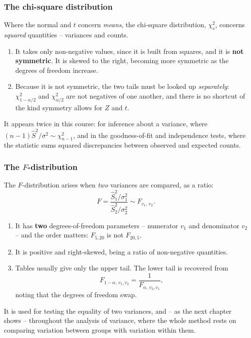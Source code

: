 \documentclass[11pt,a4paper]{article}
\theoremstyle{definition}
\begin{document}
\subsubsection{The chi-square distribution}

Where the normal and $t$ concern \emph{means}, the chi-square distribution, $\chi^2_{v}$,
concerns \emph{squared} quantities -- variances and counts.
\begin{enumerate}
\item It takes only non-negative values, since it is built from squares, and it is
\textbf{not symmetric}. It is skewed to the right, becoming more symmetric as the degrees
of freedom increase.
\item Because it is not symmetric, the two tails must be looked up \emph{separately}:
$\chi^2_{1-\alpha/2}$ and $\chi^2_{\alpha/2}$ are not negatives of one another, and there
is no shortcut of the kind symmetry allows for $Z$ and $t$.
\end{enumerate}
It appears twice in this course: for inference about a variance, where
$(n-1)\hat{S}^2/\sigma^2\sim\chi^2_{n-1}$, and in the goodness-of-fit and independence
tests, where the statistic sums squared discrepancies between observed and expected counts.

\subsubsection{The $F$-distribution}

The $F$-distribution arises when \emph{two} variances are compared, as a ratio:
\[F=\frac{\hat{S}_1^2/\sigma_1^2}{\hat{S}_2^2/\sigma_2^2}
\sim F_{v_1,\,v_2}.\]
\begin{enumerate}
\item It has \textbf{two} degrees-of-freedom parameters -- numerator $v_1$ and denominator
$v_2$ -- and the order matters: $F_{5,20}$ is not $F_{20,5}$.
\item It is positive and right-skewed, being a ratio of non-negative quantities.
\item Tables usually give only the upper tail. The lower tail is recovered from
\[F_{1-\alpha,\,v_1,v_2}=\frac{1}{F_{\alpha,\,v_2,v_1}},\]
noting that the degrees of freedom swap.
\end{enumerate}
It is used for testing the equality of two variances, and -- as the next chapter shows --
throughout the analysis of variance, where the whole method rests on comparing variation
between groups with variation within them.
\end{document}
